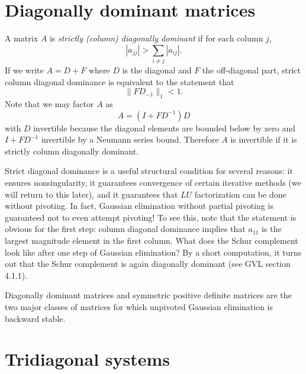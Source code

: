 \documentclass[12pt, leqno]{article} %
\begin{document}

\section{Diagonally dominant matrices}

A matrix $A$ is {\em strictly (column) diagonally dominant} if
for each column $j$,
\[
  |a_{jj}| > \sum_{i \neq j} |a_{ij}|.
\]
If we write $A = D + F$ where $D$ is the diagonal and $F$ the
off-diagonal part, strict column diagonal dominance is equivalent
to the statement that
\[
  \|FD_{-1}\|_1 < 1.
\]
Note that we may factor $A$ as
\[
  A = (I+FD^{-1}) D
\]
with $D$ invertible because the diagonal elements are bounded below
by zero and $I+FD^{-1}$ invertible by a Neumann series bound.
Therefore $A$ is invertible if it is strictly column diagonally
dominant.

Strict diagonal dominance is a useful structural condition for
several reasons: it ensures nonsingularity, it guarantees convergence
of certain iterative methods (we will return to this later), and it
guarantees that $LU$ factorization can be done without pivoting.
In fact, Gaussian elimination without partial pivoting is guaranteed
not to even attempt pivoting!  To see this, note that the statement
is obvious for the first step: column diagonal dominance implies
that $a_{11}$ is the largest magnitude element in the first column.
What does the Schur complement look like after one step of Gaussian
elimination?  By a short computation, it turns out that the Schur
complement is again diagonally dominant (see GVL section 4.1.1).

Diagonally dominant matrices and symmetric positive definite matrices
are the two major classes of matrices for which unpivoted Gaussian
elimination is backward stable.

\section{Tridiagonal systems}
\end{document}
